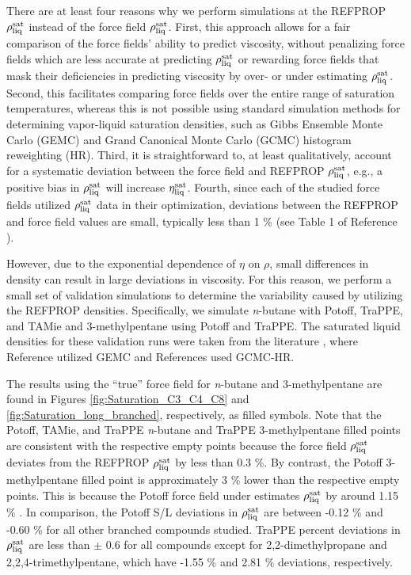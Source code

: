 \documentclass[preprint,review,12pt]{elsarticle}
\begin{document}
	There are at least four reasons why we perform simulations at the REFPROP $\rho_{\rm liq}^{\rm sat}$ instead of the force field $\rho_{\rm liq}^{\rm sat}$. First, this approach allows for a fair comparison of the force fields' ability to predict viscosity, without penalizing force fields which are less accurate at predicting $\rho_{\rm liq}^{\rm sat}$ or rewarding force fields that mask their deficiencies in predicting viscosity by over- or under estimating $\rho_{\rm liq}^{\rm sat}$.
	Second, this facilitates comparing force fields over the entire range of saturation temperatures, whereas this is not possible using standard simulation methods for determining vapor-liquid saturation densities, such as Gibbs Ensemble Monte Carlo (GEMC) and Grand Canonical Monte Carlo (GCMC) histogram reweighting (HR). Third, it is straightforward to, at least qualitatively, account for a systematic deviation between the force field and REFPROP $\rho_{\rm liq}^{\rm sat}$, e.g., a positive bias in $\rho_{\rm liq}^{\rm sat}$ will increase $\eta_{\rm liq}^{\rm sat}$. Fourth, since each of the studied force fields utilized $\rho_{\rm liq}^{\rm sat}$ data in their optimization, deviations between the REFPROP and force field values are small, typically less than 1 \% (see Table 1 of Reference ). 
	
	However, due to the exponential dependence of $\eta$ on $\rho$, small differences in density can result in large deviations in viscosity. For this reason, we perform a small set of validation simulations to determine the variability caused by utilizing the REFPROP densities. Specifically, we simulate \textit{n}-butane with Potoff, TraPPE, and TAMie and 3-methylpentane using Potoff and TraPPE. The saturated liquid densities for these validation runs were taken from the literature \cite{Mie,Martin1999,Potoff_branched,TAMie}, where Reference  utilized GEMC and References \cite{Mie,Potoff_branched,TAMie} used GCMC-HR.      
	
	The results using the ``true'' force field for \textit{n}-butane and 3-methylpentane are found in Figures \ref{fig:Saturation_C3_C4_C8} and \ref{fig:Saturation_long_branched}, respectively, as filled symbols. Note that the Potoff, TAMie, and TraPPE \textit{n}-butane and TraPPE 3-methylpentane filled points are consistent with the respective empty points because the force field $\rho_{\rm liq}^{\rm sat}$ deviates from the REFPROP $\rho_{\rm liq}^{\rm sat}$ by less than 0.3 \%. By contrast, the Potoff 3-methylpentane filled point is approximately 3 \% lower than the respective empty points. This is because the Potoff force field under estimates $\rho_{\rm liq}^{\rm sat}$ by around 1.15 \% \cite{Potoff_branched}. In comparison, the Potoff S/L deviations in $\rho_{\rm liq}^{\rm sat}$ are between -0.12 \% and -0.60 \% for all other branched compounds studied. TraPPE percent deviations in $\rho_{\rm liq}^{\rm sat}$ are less than $\pm$ 0.6 for all compounds except for 2,2-dimethylpropane and 2,2,4-trimethylpentane, which have -1.55 \% and 2.81 \% deviations, respectively.     
	
\end{document}
